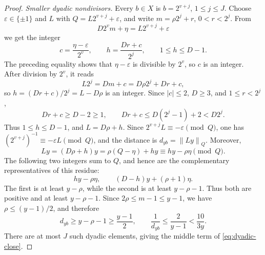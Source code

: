 \documentclass[10pt,a4paper]{amsart}
\newcommand{\normQ}[1]{\left\lVert #1\right\rVert_Q}
\begin{document}
\begin{proof}
\smallskip
\noindent\emph{Smaller dyadic nondivisors.}
Every \(b\in X\) is \(b=2^{v+j}\), \(1\le j\le J\).  Choose
\(\varepsilon\in\{\pm1\}\) and \(L\) with
\(Q=L2^{v+j}+\varepsilon\), and write
\(m=\rho2^j+r\), \(0<r<2^j\).  From
\[
 D2^vm+\eta=L2^{v+j}+\varepsilon
\]
we get the integer
\[
 c=\frac{\eta-\varepsilon}{2^v},\qquad
 h=\frac{Dr+c}{2^j},\qquad 1\le h\le D-1.
\]
The preceding equality shows that \(\eta-\varepsilon\) is divisible by
\(2^v\), so \(c\) is an integer.  After division by \(2^v\), it reads
\[
 L2^j=Dm+c=D\rho2^j+Dr+c,
\]
so \(h=(Dr+c)/2^j=L-D\rho\) is an integer.  Since \(|c|\le2\),
\(D\ge3\), and \(1\le r<2^j\),
\[
 Dr+c\ge D-2\ge1,
 \qquad
 Dr+c\le D(2^j-1)+2<D2^j.
\]
Thus \(1\le h\le D-1\), and \(L=D\rho+h\).  Since
\(2^{v+j}L\equiv-\varepsilon\pmod Q\), one has
\((2^{v+j})^{-1}\equiv-\varepsilon L\pmod Q\), and the distance is
\(d_{yb}=\normQ{Ly}\).  Moreover,
\[
 Ly=(D\rho+h)y=\rho(Q-\eta)+hy
 \equiv hy-\rho\eta\pmod Q.
\]
The following two integers sum to \(Q\), and hence are the complementary
representatives of this residue:
\[
 hy-\rho\eta,\qquad (D-h)y+(\rho+1)\eta.
\]
The first is at least \(y-\rho\), while the second is at least
\(y-\rho-1\).  Thus both are positive and at least \(y-\rho-1\).  Since
\(2\rho\le m-1\le y-1\), we have
\(\rho\le(y-1)/2\), and therefore
\[
 d_{yb}\ge y-\rho-1\ge\frac{y-1}{2},
 \qquad \frac1{d_{yb}}\le\frac2{y-1}<\frac{10}{3y}.
\]
There are at most \(J\) such dyadic elements, giving the middle term of
\eqref{eq:dyadic-close}.


\end{proof}
\end{document}
